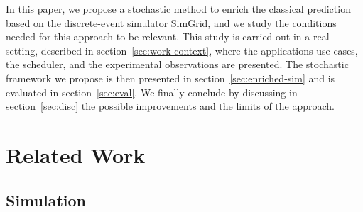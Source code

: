 \documentclass[10pt,conference,compsocconf]{IEEEtran}
\begin{document}
In this paper, we propose a stochastic method to enrich the classical prediction
based  on the  discrete-event simulator  SimGrid,  and we  study the  conditions
needed for  this approach to be  relevant. This study  is carried out in  a real
setting,  described in  section~\ref{sec:work-context},  where the  applications
use-cases, the scheduler, and the  experimental observations are presented.  The
stochastic     framework     we     propose     is     then     presented     in
section~\ref{sec:enriched-sim}  and is  evaluated in  section~\ref{sec:eval}. We
finally conclude by  discussing in section~\ref{sec:disc} the possible
improvements and the  limits of the approach.


\section{Related Work}

\subsection{Simulation}
\end{document}
